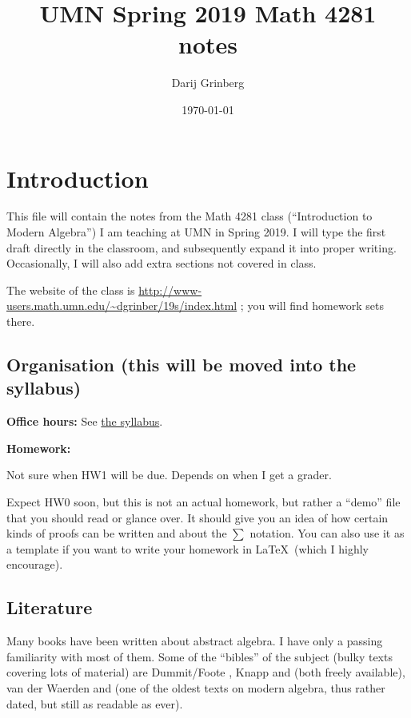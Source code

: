 \documentclass[numbers=enddot,12pt,final,onecolumn,notitlepage]{scrartcl}%
\numberwithin{exer}{section}
\theoremstyle{definition}
\let\sumnonlimits\sum
\renewcommand{\sum}{\sumnonlimits\limits}
\begin{document}
\title{UMN Spring 2019 Math 4281 notes}
\author{Darij Grinberg}
\date{
\today
}
\maketitle
\tableofcontents

\section{Introduction}

This file will contain the notes from the Math 4281 class (``Introduction
to Modern Algebra'') I am teaching at UMN in Spring 2019.
I will type the first draft directly in the classroom, and subsequently
expand it into proper writing. Occasionally, I will also add extra sections
not covered in class.

The website of the class is
\url{http://www-users.math.umn.edu/~dgrinber/19s/index.html} ; you
will find homework sets there.

\subsection{Organisation (this will be moved into the syllabus)}

\textbf{Office hours:} See
\href{http://www-users.math.umn.edu/~dgrinber/19s/syll.pdf}{the syllabus}.

\textbf{Homework:}

Not sure when HW1 will be due. Depends on when I get a grader.

Expect HW0 soon, but this is not an actual homework, but rather a ``demo''
file that you should read or glance over. It should give you an idea of
how certain kinds of proofs can be written and about the $\sum$ notation.
You can also use it as a template if you want to write your homework in
\LaTeX\ (which I highly encourage).

\subsection{Literature}

Many books have been written about abstract algebra.
I have only a passing familiarity with most of them.
Some of the ``bibles'' of the subject (bulky texts covering lots of material)
are Dummit/Foote \cite{Dummit-Foote}, Knapp \cite{Knapp1} and
\cite{Knapp2} (both freely available), van der Waerden
\cite{Waerden1} and \cite{Waerden2} (one of the oldest texts on
modern algebra, thus rather dated, but still as readable as ever).
\end{document}

